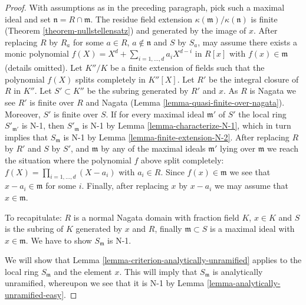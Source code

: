 \documentclass[10pt,a4paper]{amsart}
\theoremstyle{plain}
\theoremstyle{definition}
\theoremstyle{remark}
\numberwithin{equation}{subsection}
\begin{document}
\begin{proof}
\medskip\noindent
With assumptions as in the preceding paragraph, pick such a maximal
ideal and set $\mathfrak n = R \cap \mathfrak m$. The residue field
extension $\kappa(\mathfrak m)/\kappa(\mathfrak n)$ is finite
(Theorem \ref{theorem-nullstellensatz}) and generated by the image of $x$.
After replacing $R$ by $R_a$ for some $a \in R$, $a \not \in \mathfrak n$
and $S$ by $S_a$, may assume there exists a monic polynomial
$f(X) = X^d + \sum_{i = 1, \ldots, d} a_iX^{d - i}$ in $R[x]$ with
$f(x) \in \mathfrak m$ (details omitted).
Let $K''/K$ be a finite extension of fields such that the polynomial
$f(X)$ splits completely in $K''[X]$.
Let $R'$ be the integral closure of $R$ in $K''$.
Let $S' \subset K''$ be the subring generated by $R'$ and $x$.
As $R$ is Nagata we see $R'$ is finite over $R$ and Nagata
(Lemma \ref{lemma-quasi-finite-over-nagata}).
Moreover, $S'$ is finite over $S$. If for every maximal ideal
$\mathfrak m'$ of $S'$ the local ring $S'_{\mathfrak m'}$ is
N-1, then $S'_{\mathfrak m}$ is N-1 by
Lemma \ref{lemma-characterize-N-1}, which in turn
implies that $S_{\mathfrak m}$ is N-1 by
Lemma \ref{lemma-finite-extension-N-2}.
After replacing $R$ by $R'$ and $S$ by $S'$, and $\mathfrak m$ by
any of the maximal ideals $\mathfrak m'$ lying over $\mathfrak m$
we reach the situation where the polynomial $f$ above split completely:
$f(X) = \prod_{i = 1, \ldots, d} (X - a_i)$ with $a_i \in R$.
Since $f(x) \in \mathfrak m$ we see that $x - a_i \in \mathfrak m$
for some $i$. Finally, after replacing $x$ by $x - a_i$ we may assume
that $x \in \mathfrak m$.

\medskip\noindent
To recapitulate: $R$ is a normal Nagata domain with fraction field $K$,
$x \in K$ and $S$ is the subring of $K$ generated by $x$ and $R$,
finally $\mathfrak m \subset S$ is a maximal ideal with $x \in \mathfrak m$.
We have to show $S_{\mathfrak m}$ is N-1.

\medskip\noindent
We will show that Lemma \ref{lemma-criterion-analytically-unramified}
applies to the local ring
$S_{\mathfrak m}$ and the element $x$. This will imply that
$S_{\mathfrak m}$ is analytically unramified, whereupon we
see that it is N-1 by Lemma \ref{lemma-analytically-unramified-easy}.


\end{proof}
\end{document}
